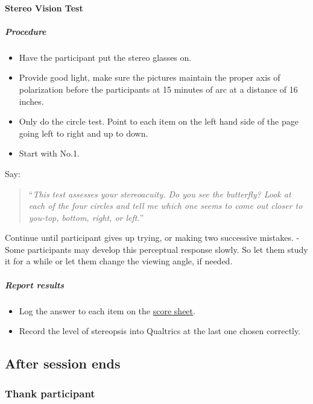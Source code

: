 \documentclass[]{article}
\providecommand{\tightlist}{%
  \setlength{\itemsep}{0pt}\setlength{\parskip}{0pt}}
\let\oldparagraph\paragraph
\renewcommand{\paragraph}[1]{\oldparagraph{#1}\mbox{}}
\let\oldsubparagraph\subparagraph
\renewcommand{\subparagraph}[1]{\oldsubparagraph{#1}\mbox{}}
\begin{document}
\paragraph{Stereo Vision Test}\label{stereo-vision-test}

\subparagraph{Procedure}\label{procedure-2}

\begin{itemize}
\tightlist
\item
  Have the participant put the stereo glasses on.
\item
  Provide good light, make sure the pictures maintain the proper axis of
  polarization before the participants at 15 minutes of arc at a
  distance of 16 inches.
\item
  Only do the circle test. Point to each item on the left hand side of
  the page going left to right and up to down.
\item
  Start with No.1.
\end{itemize}

Say:

\begin{quote}
``\emph{This test assesses your stereoacuity. Do you see the butterfly?
Look at each of the four circles and tell me which one seems to come out
closer to you-top, bottom, right, or left.}''
\end{quote}

Continue until participant gives up trying, or making two successive
mistakes. - Some participants may develop this perceptual response
slowly. So let them study it for a while or let them change the viewing
angle, if needed.

\subparagraph{Report results}\label{report-results-2}

\begin{itemize}
\tightlist
\item
  Log the answer to each item on the
  \href{vision-screening-score-sheet.html}{score sheet}.
\item
  Record the level of stereopsis into Qualtrics at the last one chosen
  correctly.
\end{itemize}

\subsection{After session ends}\label{after-session-ends}

\subsubsection{Thank participant}\label{thank-participant}
\end{document}

